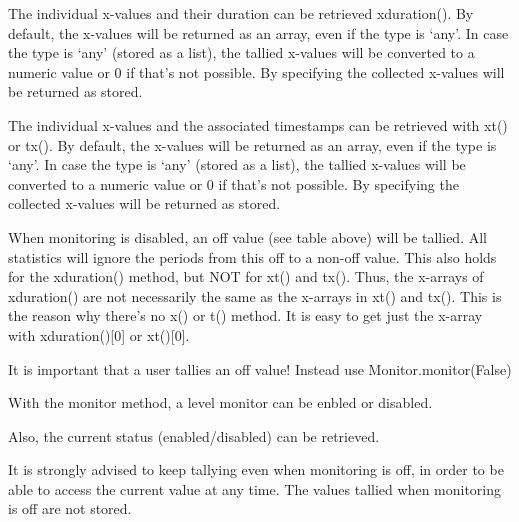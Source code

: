 \documentclass[letterpaper,10pt,english]{sphinxmanual}
\begin{document}
The individual x-values and their duration can be retrieved xduration(). By default, the x-values will be returned as an array, even if
the type is ‘any’. In case the type is ‘any’ (stored as a list), the tallied x-values will be converted to a numeric value or 0 if
that’s not possible. By specifying  the collected x-values will be returned as stored.

The individual x-values and the associated timestamps can be retrieved with xt() or tx(). By default, the x-values will be returned as an array, even if
the type is ‘any’. In case the type is ‘any’ (stored as a list), the tallied x-values will be converted to a numeric value or 0 if
that’s not possible. By specifying  the collected x-values will be returned as stored.

When monitoring is disabled, an off value (see table above) will be tallied. All statistics will ignore the periods from this
off to a non-off value. This also holds for the xduration() method, but NOT for xt() and tx(). Thus,
the x-arrays of xduration() are not necessarily the same as the x-arrays in xt() and tx(). This is
the reason why there’s no x() or t() method. 
It is easy to get just the x-array with xduration(){[}0{]} or xt(){[}0{]}.

It is important that a user  tallies an off value! Instead use Monitor.monitor(False)

With the monitor method, a level monitor can be enbled or disabled.

Also, the current status (enabled/disabled) can be retrieved.

%
\begin{sphinxVerbatim}[commandchars=\\\{\}]
  
  
 
\end{sphinxVerbatim}

It is strongly advised to keep tallying even when monitoring is off, in order to be able to access the current value at any time. The values tallied when monitoring is off
are not stored.
\end{document}
